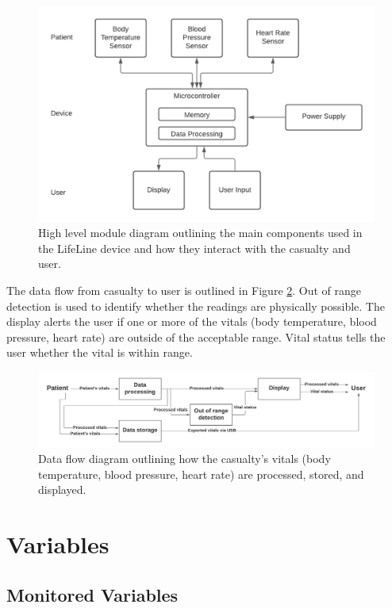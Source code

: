 \documentclass{article}
\begin{document}
    \begin{figure}[!htb]
    	\centering
    	\includegraphics[width=0.75\linewidth]{LifeLine block diagrams - Page 1.png}
    	\caption{High level module diagram outlining the main components used in the LifeLine device and how they interact with the casualty and user. }
    	\label{module}
    \end{figure}
    
    The data flow from casualty to user is outlined in Figure \ref{dataflow}.  Out of range detection is used to identify whether the readings are physically possible.  The display alerts the user if one or more of the vitals (body temperature, blood pressure, heart rate) are outside of the acceptable range.  Vital status tells the user whether the vital is within range.
    
    \begin{figure}[!htb]
    	\centering
    	\includegraphics[width=1\linewidth]{Data flow final.png}
    	\caption{Data flow diagram outlining how the casualty's vitals (body temperature, blood pressure, heart rate) are processed, stored, and displayed.}
    	\label{dataflow}
    \end{figure}
    
 
    \newpage
    
    \section{Variables}
    \subsection{Monitored Variables}
    
\end{document}
